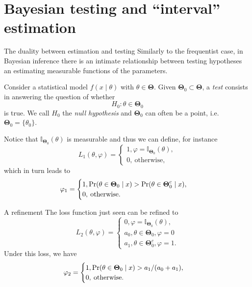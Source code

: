 \section{Bayesian testing and ``interval'' estimation}
\begin{frame}{The duality between estimation and testing}
Similarly to the frequentist case, in Bayesian inference there is an intimate relationship between testing hypotheses an estimating measurable functions of the parameters.
\begin{defn}[Test]
 Consider a statistical model $f(x \mid \theta)$  with $\theta \in \boldsymbol{\Theta}$. 
 Given $\boldsymbol{\Theta}_0 \subset \boldsymbol{\Theta}$, a \textit{test} consists in answering the question of whether
 $$ H_0 : \theta \in \boldsymbol{\Theta}_0 $$
 is true.
 We call $H_0$ the \textit{null hypothesis} and $\boldsymbol{\Theta}_0$ can often be a point, i.e. $\boldsymbol{\Theta}_0 = \{\theta_0 \}$.
\end{defn}
Notice that $\mathbb{I}_{\boldsymbol{\Theta}_0}(\theta)$ is measurable and thus we can define, for instance
\begin{equation*}
L_1(\theta, \varphi) = \begin{cases}
1, \varphi = \mathbb{I}_{\boldsymbol{\Theta}_0}(\theta),\\
0, \: \text{otherwise},
\end{cases}
\end{equation*}
which in turn leads to 
\begin{equation*}
\varphi_1 = \begin{cases}
1, \operatorname{Pr}(\theta \in \boldsymbol{\Theta}_0 \mid x) > \operatorname{Pr}(\theta \in \boldsymbol{\Theta}_0^c \mid x),\\
0, \: \text{otherwise}.
\end{cases}
\end{equation*}
\end{frame}
\begin{frame}{A refinement}
 The loss function just seen can be refined to
 \begin{equation*}
L_2(\theta, \varphi) = \begin{cases}
0, \varphi = \mathbb{I}_{\boldsymbol{\Theta}_0}(\theta),\\
a_0, \theta \in \boldsymbol{\Theta}_0, \varphi = 0\\
a_1, \theta \in \boldsymbol{\Theta}_0^c, \varphi = 1.
\end{cases}
\end{equation*}
Under this loss, we have
\begin{equation*}
\varphi_2 = \begin{cases}
1, \operatorname{Pr}(\theta \in \boldsymbol{\Theta}_0 \mid x) >  a_1/(a_0 + a_1),\\
0, \: \text{otherwise}.
\end{cases}
\end{equation*}
\end{frame}
